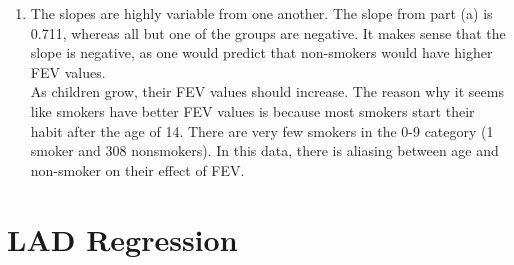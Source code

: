 \documentclass[12pt]{article}
\begin{document}
\begin{enumerate}
\item

The slopes are highly variable from one another. The slope from part (a) is 0.711, whereas all but one of the groups are negative. It makes sense that the slope is negative, as one would predict that non-smokers would have higher FEV values.
\\[10 pt]
As children grow, their FEV values should increase. The reason why it seems like smokers have better FEV values is because most smokers start their habit after the age of 14. There are very few smokers in the 0-9 category (1 smoker and 308 nonsmokers). In this data, there is aliasing between age and non-smoker on their effect of FEV.
\end{enumerate}
 
\section{LAD Regression}
\end{document}

